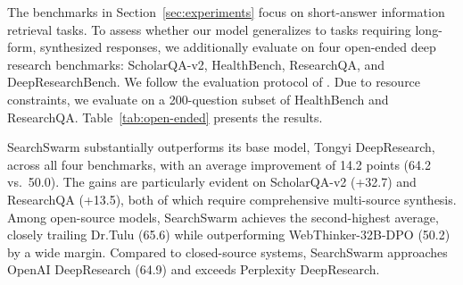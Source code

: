 \documentclass{llmxive}
\begin{document}
\begin{table}[t]
\centering
{}
\caption{Results on open-ended deep research benchmarks. Due to resource constraints, we evaluate on a 200-question subset of HealthBench and ResearchQA. Average is computed only when all four scores are available. \textbf{Bold} indicates the best result among open-source models.}
\label{tab:open-ended}
\end{table}

The benchmarks in Section~\ref{sec:experiments} focus on short-answer information retrieval tasks. To assess whether our model generalizes to tasks requiring long-form, synthesized responses, we additionally evaluate on four open-ended deep research benchmarks: ScholarQA-v2, HealthBench, ResearchQA, and DeepResearchBench. We follow the evaluation protocol of \citet{shao2025dr}. Due to resource constraints, we evaluate on a 200-question subset of HealthBench and ResearchQA. Table~\ref{tab:open-ended} presents the results.

SearchSwarm substantially outperforms its base model, Tongyi DeepResearch, across all four benchmarks, with an average improvement of 14.2 points (64.2 vs.\ 50.0). The gains are particularly evident on ScholarQA-v2 (+32.7) and ResearchQA (+13.5), both of which require comprehensive multi-source synthesis. Among open-source models, SearchSwarm achieves the second-highest average, closely trailing Dr.Tulu (65.6) while outperforming WebThinker-32B-DPO (50.2) by a wide margin. Compared to closed-source systems, SearchSwarm approaches OpenAI DeepResearch (64.9) and exceeds Perplexity DeepResearch.
\end{document}
